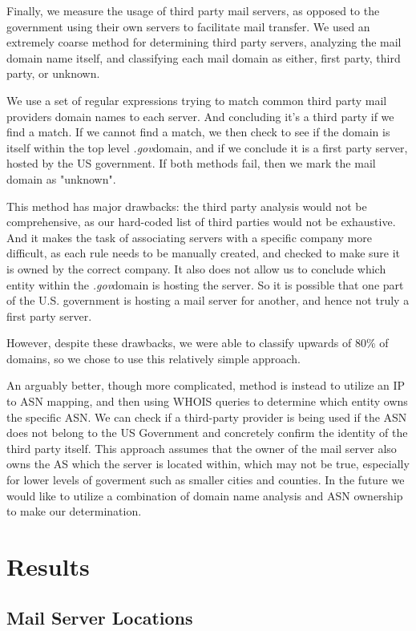 \documentclass{hotnets21}
\newcommand{\dotgov}{\textit{.gov}\space}
\begin{document}
Finally, we measure the usage of third party mail servers, as opposed to the government using their own servers to facilitate mail transfer.
We used an extremely coarse method for determining third party servers, analyzing the mail domain name itself, and classifying each mail domain as either, first party, third party, or unknown.

We use a set of regular expressions trying to match common third party mail providers domain names to each server.
And concluding it's a third party if we find a match.
If we cannot find a match, we then check to see if the domain is itself within the top level \dotgov domain, and if we conclude it is a first party server, hosted by the US government.
If both methods fail, then we mark the mail domain as "unknown".

This method has major drawbacks: the third party analysis would not be comprehensive, as our hard-coded list of third parties would not be exhaustive.
And it makes the task of associating servers with a specific company more difficult, as each rule needs to be manually created, and checked to make sure it is owned by the correct company.
It also does not allow us to conclude which entity within the \dotgov domain is hosting the server. So it is possible that one part of the U.S. government is hosting a mail server for another, and hence not truly a first party server.

However, despite these drawbacks, we were able to classify upwards of 80\% of domains, so we chose to use this relatively simple approach.

An arguably better, though more complicated, method is instead to utilize an IP to ASN mapping, and then using WHOIS queries to determine which entity owns the specific ASN.
We can check if a third-party provider is being used if the ASN does not belong to the US Government and concretely confirm the identity of the third party itself.
This approach assumes that the owner of the mail server also owns the AS which the server is located within, which may not be true, especially for lower levels of goverment such as smaller cities and counties.
In the future we would like to utilize a combination of domain name analysis and ASN ownership to make our determination.

\section{Results}

\subsection{Mail Server Locations}
\end{document}
